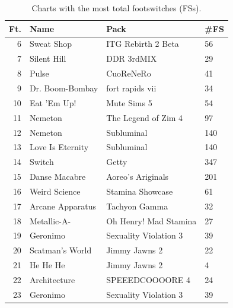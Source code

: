 \documentclass[10pt]{sigplanconf}
\begin{document}
\begin{table}[t]
	\begin{center}
		\small
	\begin{tabular}{r|l|l|l}
		\bf Ft. & \bf Name & \bf Pack & \bf \#FS \\
		\hline
		 6 & Sweat Shop       & ITG Rebirth 2 Beta    &  56 \\
		 7 & Silent Hill      & DDR 3rdMIX            &  29 \\
		 8 & Pulse            & CuoReNeRo             &  41 \\
		 9 & Dr. Boom-Bombay  & fort rapids vii       &  34 \\
		10 & Eat 'Em Up!      & Mute Sims 5           &  54 \\
		11 & Nemeton          & The Legend of Zim 4   &  97 \\
		12 & Nemeton          & Subluminal            & 140 \\
		13 & Love Is Eternity & Subluminal            & 140 \\
		14 & Switch           & Getty                 & 347 \\
		15 & Danse Macabre    & Aoreo's Ariginals     & 201 \\
		16 & Weird Science    & Stamina Showcase      &  61 \\
		17 & Arcane Apparatus & Tachyon Gamma         &  32 \\
		18 & Metallic-A-      & Oh Henry! Mad Stamina &  27 \\
		19 & Geronimo         & Sexuality Violation 3 &  39 \\
		20 & Scatman's World  & Jimmy Jawns 2         &  22 \\
		21 & He He He         & Jimmy Jawns 2         &   4 \\
		22 & Architecture     & SPEEEDCOOOORE 4       &  24 \\
		23 & Geronimo         & Sexuality Violation 3 &  39 \\
	\end{tabular}
	\end{center}
	\caption{Charts with the most total footswitches (FSs).}
\end{table}
\end{document}
